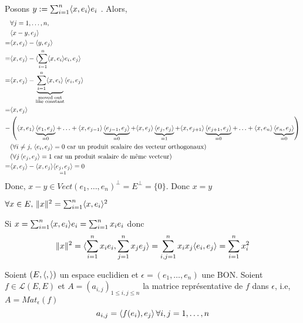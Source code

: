 \begin{preuve}
    Posons $y := \sum_{i=1}^{n} \langle x, e_i \rangle e_i$ . Alors, 
   \begin{align*}
       &\forall j = 1, \ldots, n,\\
       &\langle x - y, e_j \rangle\\ 
       = &\langle x, e_j \rangle - \langle y, e_j \rangle\\ 
       = &\langle x, e_j \rangle - \langle \sum_{i=1}^{n} \langle x, e_i \rangle e_i, e_j \rangle\\ 
       = &\langle x, e_j \rangle - \underbrace{ \sum_{i=1}^{n} \langle x, e_i \rangle }_{\substack{\text{moved out}\\ \text{like constant}}}\langle e_i, e_j \rangle\\ 
       = &\langle x, e_j \rangle\\ 
       -& \left(\langle x, e_1 \rangle\underbrace{ \langle e_1, e_j \rangle }_{= 0} + \ldots + \langle x, e_{j-1} \rangle\underbrace{\langle e_{j-1}, e_j \rangle}_{= 0} + \langle x, e_{j} \rangle\underbrace{ \langle e_{j}, e_j \rangle }_{= 1} + \langle x, e_{j+1} \rangle\underbrace{ \langle e_{j+1}, e_j \rangle }_{= 0} + \ldots + \langle x, e_{n} \rangle\underbrace{ \langle e_{n}, e_j \rangle }_{= 0}\right)\\
        &\text{(} \forall i \neq j, \, \langle e_i, e_j \rangle = 0 \text{ car un produit scalaire des vecteur orthogonaux)}\\ 
        &\text{(} \forall j \, \langle e_j, e_j \rangle = 1 \text{ car un produit scalaire de même vecteur)}\\
       = &\langle x, e_j \rangle - \langle x, e_j \rangle\underset{= 1}{\langle e_j, e_j \rangle} = 0
   \end{align*}
   Donc, $x - y \in Vect(e_1, \ldots, e_n)^{\perp} = E^{\perp} = \{0\}$. Donc $x = y$
\end{preuve}
\begin{corollary}
    $\forall x \in E, \, \|x\|^2 = \sum_{i=1}^{n} \langle x, e_i \rangle^2$ 
\end{corollary}
\begin{preuve}
    Si $x = \sum_{i=1}^{n} \langle x, e_i \rangle e_i = \sum_{i=1}^{n} x_ie_i$ donc
    \[
        \|x\|^2 = \langle \sum_{i=1}^{n} x_ie_i, \sum_{j=1}^{n} x_je_j \rangle = \sum_{i,j=1}^{n} x_ix_j\langle e_i, e_j \rangle = \sum_{i=1}^{n} x_i^2
    \] 
\end{preuve}
\begin{prop} Soient $(E, \langle , \rangle)$ un espace euclidien et $\epsilon = (e_1, \ldots, e_n)$ une BON. Soient $f \in \mathcal{L}(E, E)$ et $A = (a_{i,j})_{1 \le i,j \le n}$ la matrice représentative de $f$ dans  $\epsilon$, i.e,  $A = Mat_{\epsilon}(f)$ 
    \[
        a_{i,j} = \langle f(e_i), e_j \rangle \, \forall i,j = 1, \ldots, n
    \] 
\end{prop}

